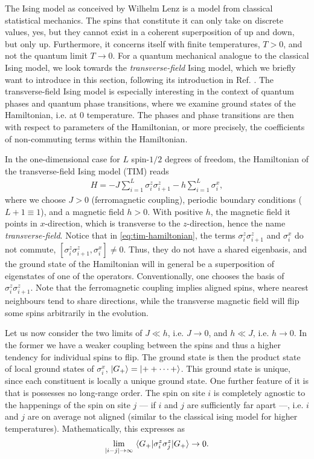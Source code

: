 The Ising model as conceived by Wilhelm Lenz is a model from classical
statistical mechanics. The spins that constitute it can only take on discrete
values, yes, but they cannot exist in a coherent superposition of up and down,
but only up. Furthermore, it concerns itself with finite temperatures, $T>0$,
and not the quantum limit $T\to 0$. 
For a quantum mechanical analogue to the classical Ising model, we
look towards the \emph{transverse-field} Ising model, which we briefly want to
introduce in this section, following its introduction in Ref.
\cite{langLectureNotesTopological2021}. The transverse-field Ising model is
especially interesting in the context of quantum phases and quantum phase
transitions, where we examine ground states of the Hamiltonian, i.e. at $0$
temperature. The phases and phase transitions are then with respect to
parameters of the Hamiltonian, or more precisely, the coefficients of
non-commuting terms within the Hamiltonian.

In the one-dimensional
case for $L$ spin-$1 /2$ degrees of freedom, the Hamiltonian of the
transverse-field Ising model (TIM) reads
\begin{align}\label{eq:tim-hamiltonian}
  H = -J\sum_{i=1}^L \sigma_i^z \sigma_{i+1}^z - h\sum_{i=1}^L \sigma_i^x
,\end{align}
where we choose $J>0$ (ferromagnetic coupling), periodic boundary conditions
($L+1 \equiv 1$), and a magnetic field $h>0$. With
positive $h$, the magnetic field it points in $x$-direction, which is transverse to the
$z$-direction, hence the name \emph{transverse-field}. 
Notice that in \cref{eq:tim-hamiltonian}, the terms $\sigma_i^z\sigma_{i+1}^z$
and $\sigma_i^x$ do not commute, $[\sigma_i^z\sigma_{i+1}^z,\sigma_i^x]\neq 0$.
Thus, they do not have a shared eigenbasis, and the ground state of the
Hamiltonian will in general be a superposition of eigenstates of one of the
operators. Conventionally, one chooses the basis of $\sigma_i^z\sigma_{i+1}^z$.
Note that the ferromagnetic coupling implies aligned spins, where nearest
neighbours tend to share directions, while the transverse magnetic field will
flip some spins arbitrarily in the evolution.

Let us now consider the two limits of $J \ll h$, i.e. $J\to 0$,  and $h \ll J$,
i.e. $h \to 0$. In the former we have a weaker coupling between the spins and
thus a higher tendency for individual spins to flip. The ground state is then
the product state of local ground states of $\sigma_i^x$, $\ket{G_+} =
\ket{++\cdots +}$. This ground state is unique, since each constituent is
locally a
unique ground state. One further feature of it is that is possesses no
long-range order. The spin on site $i$ is completely agnostic to the happenings
of the spin on site $j$ --- if $i$ and $j$ are sufficiently far apart ---, i.e.
$i$ and $j$ are on
average not aligned (similar to the classical ising model for higher
temperatures). Mathematically, this expresses as 
\begin{align}
\lim_{\abs{i-j}\to\infty} \expval{\sigma_i^z\sigma_j^z}{G_+} \to 0
.\end{align}

